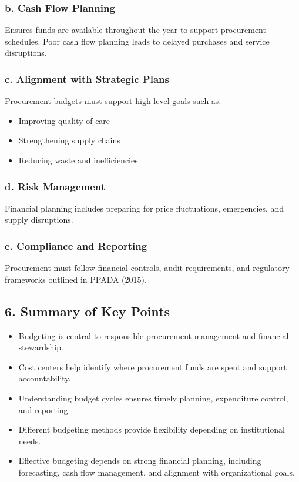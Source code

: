 \documentclass[10pt]{article}
\begin{document}
\subsubsection*{b. Cash Flow Planning}
Ensures funds are available throughout the year to support procurement schedules. Poor cash flow planning leads to delayed purchases and service disruptions.

\subsubsection*{c. Alignment with Strategic Plans}
Procurement budgets must support high-level goals such as:

\begin{itemize}
  \item Improving quality of care
  \item Strengthening supply chains
  \item Reducing waste and inefficiencies
\end{itemize}

\subsubsection*{d. Risk Management}
Financial planning includes preparing for price fluctuations, emergencies, and supply disruptions.

\subsubsection*{e. Compliance and Reporting}
Procurement must follow financial controls, audit requirements, and regulatory frameworks outlined in PPADA (2015).

\subsection*{6. Summary of Key Points}
\begin{itemize}
  \item Budgeting is central to responsible procurement management and financial stewardship.
  \item Cost centers help identify where procurement funds are spent and support accountability.
  \item Understanding budget cycles ensures timely planning, expenditure control, and reporting.
  \item Different budgeting methods provide flexibility depending on institutional needs.
  \item Effective budgeting depends on strong financial planning, including forecasting, cash flow management, and alignment with organizational goals.
\end{itemize}
\end{document}
